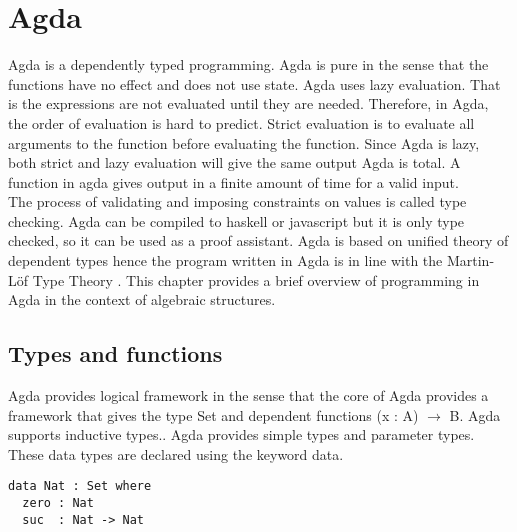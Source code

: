 \chapter{Agda}
Agda is a dependently typed programming. Agda is pure in the sense that the
functions have no effect and does not use state. Agda uses lazy evaluation. That
is the expressions are not evaluated until they are needed. Therefore, in Agda,
the order of evaluation is hard to predict. Strict evaluation is to evaluate all
arguments to the function before evaluating the function. Since Agda is lazy,
both strict and lazy evaluation will give the same output
\cite{kidney2020finiteness} Agda is total. A function in agda gives output in a
finite amount of time for a valid input.\\
The process of validating and imposing constraints on values is called type
checking. Agda can be compiled to haskell or javascript but it is only type
checked, so it can be used as a proof assistant. Agda is based on unified theory
of dependent types \cite{enwiki:1127496533} hence the program written in Agda is
in line with the Martin-Löf Type Theory \cite{kidney2020finiteness}. This
chapter provides a brief overview of programming in Agda in the context of
algebraic structures. 

\section{Types and functions}
Agda provides logical framework in the sense that the core of Agda provides a
framework that gives the type Set and dependent functions (x : A)
\(\rightarrow\) B. Agda supports inductive
types.\cite{10.1007/978-3-642-03359-9_6}. Agda provides simple types and
parameter types. These data types are declared using the keyword data.

\begin{verbatim}
data Nat : Set where
  zero : Nat
  suc  : Nat -> Nat
\end{verbatim}

